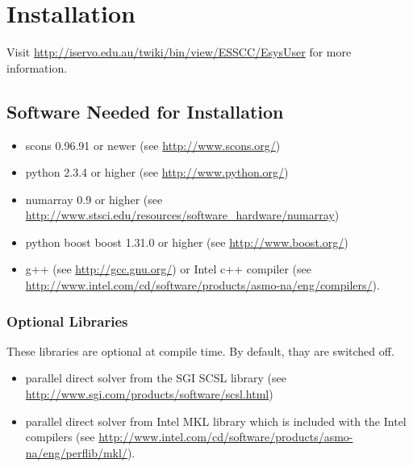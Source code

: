 %
%
%
%
%
%

\chapter{Installation}
\label{INSTALL}

Visit \url{http://iservo.edu.au/twiki/bin/view/ESSCC/EsysUser} for more information.

\section{Software Needed for Installation}

\begin{itemize}
   \item scons  0.96.91 or newer (see \url{http://www.scons.org/})
   \item python  2.3.4 or higher (see \url{http://www.python.org/})
   \item numarray  0.9 or higher (see \url{http://www.stsci.edu/resources/software_hardware/numarray})
   \item python boost boost  1.31.0 or higher (see \url{http://www.boost.org/})
   \item g++ (see \url{http://gcc.gnu.org/}) or Intel c++  compiler (see \\
\url{http://www.intel.com/cd/software/products/asmo-na/eng/compilers/}).
\end{itemize}

\subsection{Optional Libraries}
These libraries are optional at compile time. By default, thay are switched off.
\begin{itemize}
   \item parallel direct solver from the SGI SCSL library (see \url{http://www.sgi.com/products/software/scsl.html})
   \item parallel direct solver from Intel MKL library which is included with the Intel compilers (see \url{http://www.intel.com/cd/software/products/asmo-na/eng/perflib/mkl/}).
\end{itemize}

